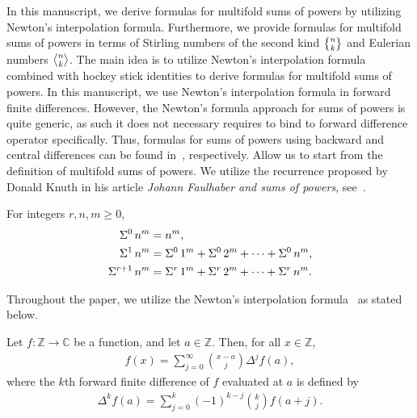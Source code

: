 In this manuscript, we derive formulas for multifold sums of powers
by utilizing Newton's interpolation formula.
Furthermore, we provide formulas for multifold sums of powers in terms
of Stirling numbers of the second kind $\stirlingii{n}{k}$
and Eulerian numbers $\eulerian{n}{k}$.
The main idea is to utilize Newton's interpolation formula
combined with hockey stick identities to
derive formulas for multifold sums of powers.
In this manuscript, we use Newton's interpolation formula
in forward finite differences.
However, the Newton's formula approach for sums of powers is quite generic,
as such it does not necessary requires to bind to forward difference operator
specifically. Thus, formulas for sums of powers using backward and central
differences can be found
in~\cite{kolosov_2026_18134757, kolosov_2025_18098442}, respectively.
Allow us to start from the definition of multifold sums of powers.
We utilize the recurrence proposed by Donald Knuth in his article
\textit{Johann Faulhaber and sums of powers}, see~\cite{knuth1993johann}.
\begin{proposition} 
  \label{prop:multifold-sums-of-powers-recurrence}
  For integers $r,n,m \geq 0$,
  \begin{align*}
    \Sigma^{0}\,{n}^{m}   &= n^m, \\
    \Sigma^{1}\,{n}^{m}   &= \Sigma^{0}\,{1}^{m}
    + \Sigma^{0}\,{2}^{m} + \cdots + \Sigma^{0}\,{n}^{m}, \\
    \Sigma^{r+1}\,{n}^{m} &= \Sigma^{r}\,{1}^{m}
    + \Sigma^{r}\,{2}^{m} + \cdots + \Sigma^{r}\,{n}^{m}.
  \end{align*}
\end{proposition}
Throughout the paper, we utilize the Newton's interpolation
formula~\cite[Lemma V.]{newton1850newton} as stated below.
\begin{proposition}
  Let $f\colon \mathbb{Z} \to \mathbb{C}$ be a function,
  and let $a \in \mathbb{Z}$.
  Then, for all $x \in \mathbb{Z}$,
  \begin{align*}
    f(x) = \sum_{j=0}^{\infty} \binom{x-a}{j} \Delta^{j} f(a),
  \end{align*}
  where the $k$th forward finite difference of $f$ evaluated at $a$ is defined by
  \begin{align*}
    \Delta^{k} f(a)
    = \sum_{j=0}^{k} (-1)^{k-j} \binom{k}{j} f(a+j).
  \end{align*}
\end{proposition}

